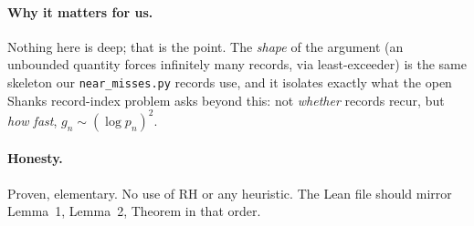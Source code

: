 \documentclass[11pt]{article}
\begin{document}
\paragraph{Why it matters for us.} Nothing here is deep; that is the point. The
\emph{shape} of the argument (an unbounded quantity forces infinitely many records,
via least-exceeder) is the same skeleton our \texttt{near\_misses.py} records use,
and it isolates exactly what the open Shanks record-index problem asks beyond this:
not \emph{whether} records recur, but \emph{how fast}, $g_n\sim(\log p_n)^2$.

\paragraph{Honesty.} Proven, elementary. No use of RH or any heuristic. The
Lean file should mirror Lemma~1, Lemma~2, Theorem in that order.
\end{document}
